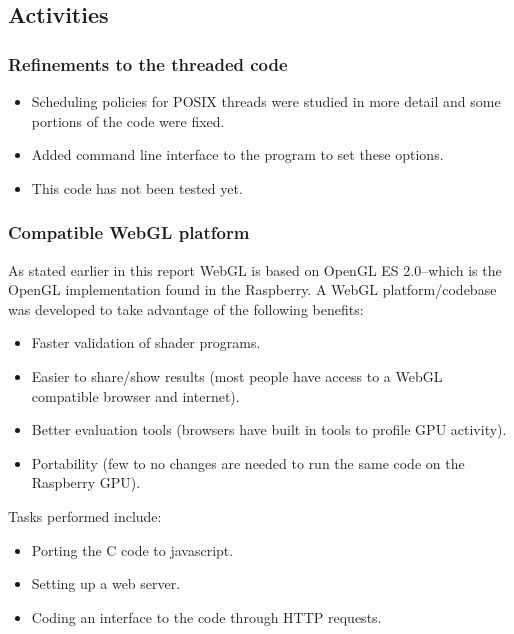 \subsection{Activities}

\subsubsection{Refinements to the threaded code}
\begin{itemize}
	\item Scheduling policies for POSIX threads were studied in more detail and some portions of the code were fixed.
	\item Added command line interface to the program to set these options.
	\item This code has not been tested yet.
\end{itemize}


\subsubsection{Compatible WebGL platform}
As stated earlier in this report WebGL is based on OpenGL ES 2.0--which is the OpenGL implementation found in the Raspberry. A WebGL platform/codebase was developed to take advantage of the following benefits:
\begin{itemize}
	\item Faster validation of shader programs.
	\item Easier to share/show results (most people have access to a WebGL compatible browser and internet).
	\item Better evaluation tools (browsers have built in tools to profile GPU activity).
	\item Portability (few to no changes are needed to run the same code on the Raspberry GPU).
\end{itemize}

Tasks performed include:
\begin{itemize}
	\item Porting the C code to javascript.
	\item Setting up a web server.
	\item Coding an interface to the code through HTTP requests.
\end{itemize}

